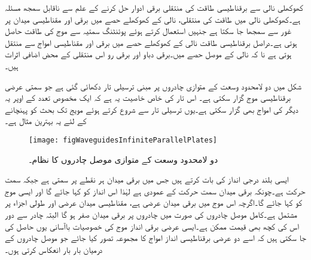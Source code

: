 کھوکھلی نالی سے برقناطیسی طاقت کی منتقلی برقی ادوار حل کرنے کے علم سے ناقابل سمجھ مسئلہ ہے۔کھوکھلی نالی میں طاقت کی منتقلی، نالی کے کھوکھلے حصے میں برقی اور مقناطیسی میدان پر غور سے سمجھا جا سکتا ہے جنہیں استعمال کرتے ہوئے  پوئنٹنگ سمتیہ سے موج کی طاقت حاصل ہوتی ہے۔دراصل برقناطیسی طاقت نالی کے کھوکھلے حصے میں برقی اور مقناطیسی امواج سے منتقل ہوتی ہے نا کہ نالی کے موصل حصے میں۔برقی دباو اور برقی رو اس منتقلی کے محض اضافی اثرات ہیں۔ 

شکل  میں دو لامحدود وسعت کے متوازی چادروں پر مبنی ترسیلی تار دکھائی گئی ہے جو  سمتی عرضی برقناطیسی موج گزار سکتی
 ہے۔ اس تار کی خاص خاصیت یہ ہے کہ ایک مخصوص تعدد کے اوپر یہ دیگر  کی امواج بھی گزار سکتی ہے۔یوں ترسیلی تار سے شروع کرتے ہوئے مویج تک بحث کو پہنچانے  کے لئے یہ بہترین مثال ہے۔

\begin{figure}
\centering
\texttt{[image: figWaveguidesInfiniteParallelPlates]}
\caption{دو لامحدود وسعت کے متوازی موصل چادروں کا نظام۔}
\label{شکل_مویج_لامحدود_متوازی_چادر}
\end{figure}

ایسی بلند درجی انداز کی بات کرتے ہیں جس میں برقی میدان ہر نقطے پر  سمتی ہے جبکہ سمت حرکت  ہے۔چونکہ برقی میدان سمت حرکت کے عمودی ہے لہٰذا اس انداز کو   کہا جائے گا اور ایسی موج کو  کہا جائے گا۔اگرچہ اس موج میں برقی میدان عرضی ہے، مقناطیسی میدان عرضی اور طولی اجزاء پر مشتمل ہے۔کامل موصل چادروں کی صورت میں چادروں پر برقی میدان صفر ہو گا البتہ چادر سے دور  اس کی کچھ بھی قیمت ممکن ہے۔ایسی عرضی برقی انداز موج کی خصوصیات باآسانی یوں حاصل کی جا سکتی ہیں کہ اسے دو عرضی برقناطیسی انداز  امواج کا مجموعہ تصور کیا جائے جو موصل چادروں کے درمیان بار بار انعکاس کرتی ہوں۔

